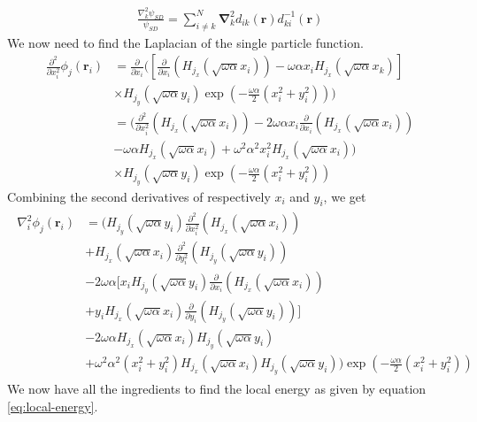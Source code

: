 \documentclass[11pt]{article}
\begin{document}
\begin{align}
	\frac{\nabla^2_k\psi_{SD}}{\psi_{SD}} = \sum_{i\neq k}^N\bm{\nabla}^2_k d_{ik}(\mathbf{r})d_{ki}^{-1}(\mathbf{r})
	\label{eq:laplacian-slater}
\end{align}
We now need to find the Laplacian of the single particle function.
\begin{align*}
	\frac{\partial^2}{\partial x_i^2} \phi_j(\mathbf{r}_i) &= \frac{\partial}{\partial x_i} \bigg(\left[ \frac{\partial}{\partial x_i}\left( H_{j_x} (\sqrt{\omega\alpha}x_i) \right) - \omega\alpha x_i H_{j_x} (\sqrt{\omega\alpha}x_k) \right] \\
	&\times H_{j_y} (\sqrt{\omega\alpha} y_i)\exp{\left(-\frac{\omega\alpha}{2}\left( x_i^2 + y_i^2 \right)\right)} \bigg) \\
	&= \bigg( \frac{\partial^2}{\partial x_i^2} \left( H_{j_x} (\sqrt{\omega\alpha}x_i) \right) - 2\omega\alpha x_i \frac{\partial}{\partial x_i}\left( H_{j_x} (\sqrt{\omega\alpha}x_i) \right) \\ 
	&- \omega \alpha H_{j_x} (\sqrt{\omega\alpha}x_i) + \omega^2 \alpha^2 x_i^2 H_{j_x} (\sqrt{\omega\alpha}x_i) \bigg) \\
	&\times H_{j_y} (\sqrt{\omega\alpha} y_i) \exp{\left(-\frac{\omega\alpha}{2}\left( x_i^2 + y_i^2 \right)\right)}
\end{align*}
Combining the second derivatives of respectively $x_i$ and $y_i$, we get
\begin{align}
	\begin{split}
		\nabla_i^2 \phi_j(\mathbf{r}_i) &= \bigg(
			H_{j_y} (\sqrt{\omega\alpha} y_i) \frac{\partial^2}{\partial x_i^2} \left( H_{j_x} (\sqrt{\omega\alpha}x_i) \right) \\
			&+ H_{j_x} (\sqrt{\omega\alpha}x_i) \frac{\partial^2}{\partial y_i^2} \left( H_{j_y} (\sqrt{\omega\alpha}y_i) \right) \\
			&- 2\omega\alpha \bigg[ x_i H_{j_y} (\sqrt{\omega\alpha} y_i) \frac{\partial}{\partial x_i}\left( H_{j_x} (\sqrt{\omega\alpha}x_i) \right) \\
			&+ y_i H_{j_x} (\sqrt{\omega\alpha}x_i) \frac{\partial}{\partial y_i}\left( H_{j_y} (\sqrt{\omega\alpha}y_i) \right) \bigg] \\
			&- 2\omega\alpha H_{j_x} (\sqrt{\omega\alpha}x_i) H_{j_y} (\sqrt{\omega\alpha} y_i) \\
			&+ \omega^2 \alpha^2(x_i^2+y_i^2) H_{j_x} (\sqrt{\omega\alpha}x_i) H_{j_y} (\sqrt{\omega\alpha} y_i)
		\bigg) \exp{\left(-\frac{\omega\alpha}{2}\left( x_i^2 + y_i^2 \right)\right)}
	\end{split}
	\label{eq:wf-sp-laplacian}
\end{align}
We now have all the ingredients to find the local energy as given by equation \eqref{eq:local-energy}.
\end{document}

